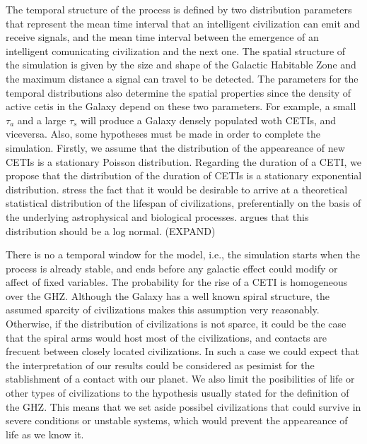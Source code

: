 \documentclass[crop]{CSLB}%
\begin{document}
The temporal structure of the process is defined by two distribution parameters that
represent the mean time interval that an intelligent civilization can
emit and receive signals, and the mean time interval between the
emergence of an intelligent comunicating civilization and the next
one.
%
The spatial structure of the simulation is given by the size and shape
of the Galactic Habitable Zone and the maximum distance a signal can
travel to be detected.
%
The parameters for the temporal distributions also determine the
spatial properties since the density of active cetis in the Galaxy depend on these
two parameters.
%
For example, a small $\tau_a$ and a large $\tau_s$ will produce a
Galaxy densely populated woth CETIs, and viceversa.
%
Also, some hypotheses must be made in order to complete the
simulation.
%
Firstly, we assume that the distribution of the appeareance of new
CETIs is a stationary Poisson distribution.
%
Regarding the duration of a CETI, we propose that the distribution of
the duration of CETIs is a stationary exponential distribution.
%
\citet{Balbi2018} stress the fact that it would be desirable to arrive
at a theoretical statistical distribution of the lifespan of
civilizations, preferentially on the basis of the underlying
astrophysical and biological processes.
%
\citet{Maccone} argues that this distribution should be a log normal.
(EXPAND)




There is no a temporal window for the model, i.e., the simulation
starts when the process is already stable, and ends before any
galactic effect could modify or affect of fixed variables.
%
The probability for the rise of a CETI is homogeneous over the GHZ.
%
Although the Galaxy has a well known spiral structure, the assumed
sparcity of civilizations makes this assumption very reasonably.
%
Otherwise, if the distribution of civilizations is not sparce, it
could be the case that the spiral arms would host most of the
civilizations, and contacts are frecuent between closely located
civilizations.
%
In such a case we could expect that the interpretation of our results
could be considered as pesimist for the stablishment of a contact with
our planet.
%
We also limit the posibilities of life or other types of civilizations
to the hypothesis usually stated for the definition of the GHZ.
%
This means that we set aside possibel civilizations that could survive
in severe conditions or unstable systems, which would prevent the
appeareance of life as we know it.
\end{document}

